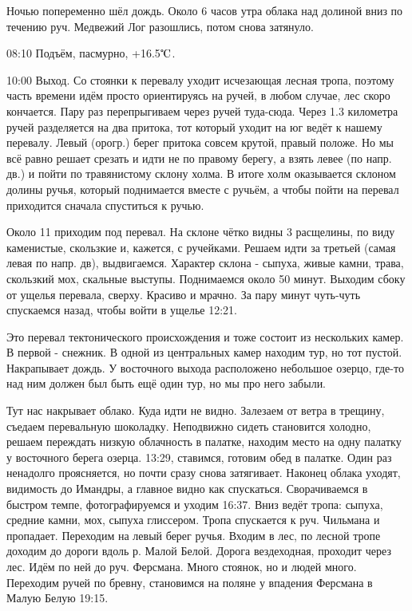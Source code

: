 Ночью попеременно шёл дождь. Около 6 часов утра облака над долиной вниз по течению руч. Медвежий Лог разошлись,
потом снова затянуло.

08:10 Подъём, пасмурно, +16.5$\tccentigrade$.

10:00 Выход.
Со стоянки к перевалу уходит исчезающая лесная тропа, поэтому часть времени идём просто ориентируясь на ручей,
в любом случае, лес скоро кончается. Пару раз перепрыгиваем через ручей туда-сюда.
Через 1.3 километра ручей разделяется на два притока, тот который уходит на юг ведёт к нашему перевалу.
Левый (орогр.) берег притока совсем крутой, правый положе. Но мы всё равно решает срезать и идти не по правому берегу,
а взять левее (по напр. дв.) и  пойти по травянистому склону холма. В итоге холм оказывается склоном долины ручья,
который поднимается вместе с ручьём, а чтобы пойти на перевал приходится сначала спуститься к ручью.

Около 11 приходим под перевал. На склоне чётко видны 3 расщелины, по виду каменистые, скользкие и, кажется, с ручейками.
Решаем идти за третьей (самая левая по напр. дв), выдвигаемся. Характер склона - сыпуха, живые камни, трава,
скользкий мох, скальные выступы. Поднимаемся около 50 минут. Выходим сбоку от ущелья перевала, сверху.
Красиво и мрачно. За пару минут чуть-чуть спускаемся назад, чтобы войти в ущелье 12:21.

Это перевал тектонического происхождения и тоже состоит из нескольких камер. В первой - снежник.
В одной из центральных камер находим тур, но тот пустой. Накрапывает дождь. У восточного выхода расположено
небольшое озерцо, где-то над ним должен был быть ещё один тур, но мы про него забыли.

Тут нас накрывает облако. Куда идти не видно. Залезаем от ветра в трещину, съедаем перевальную шоколадку.
Неподвижно сидеть становится холодно, решаем переждать низкую облачность в палатке, находим место на одну палатку
у восточного берега озерца. 13:29, ставимся, готовим обед в палатке. Один раз ненадолго проясняется,
но почти сразу снова затягивает. Наконец облака уходят, видимость до Имандры, а главное видно как спускаться.
Сворачиваемся в быстром темпе, фотографируемся и уходим 16:37.
Вниз ведёт тропа: сыпуха, средние камни, мох, сыпуха глиссером. Тропа спускается к руч. Чильмана и пропадает.
Переходим на левый берег ручья. Входим в лес, по лесной тропе доходим до дороги вдоль р. Малой Белой.
Дорога вездеходная, проходит через лес. Идём по ней до руч. Ферсмана. Много стоянок, но и людей много.
Переходим ручей по бревну, становимся на поляне у впадения Ферсмана в Малую Белую 19:15.

